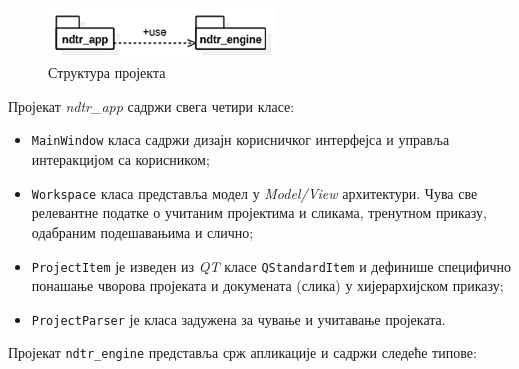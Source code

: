 \documentclass[11pt,a4paper,serbian,oneside]{book}
\begin{document}
\begin{figure}[H]
\begin{center}
\includegraphics[width=60mm]{images/struktura.png}
\end{center}
\caption{Структура пројекта}
\label{fig:struktura}
\end{figure}

Пројекат \textit{ndtr\_app} садржи свега четири класе:

\begin{itemize}
  \item \texttt{MainWindow} класа садржи дизајн корисничког интерфејса и управља интеракцијом са корисником;
  \item \texttt{Workspace} класа представља модел у \textit{Model/View} архитектури. Чува све релевантне податке о учитаним пројектима и сликама, тренутном приказу, одабраним по\-де\-ша\-ва\-њи\-ма и слично;
  \item \texttt{ProjectItem} је изведен из \textit{QT} класе \texttt{QStandardItem} и дефинише специфично по\-на\-ша\-ње чворова пројеката и докумената (слика) у хијерархијском приказу;
  \item \texttt{ProjectParser} је класа задужена за чување и учитавање пројеката.
\end{itemize}

Пројекат \texttt{ndtr\_engine} представља срж апликације и садржи следеће типове:
\end{document}
